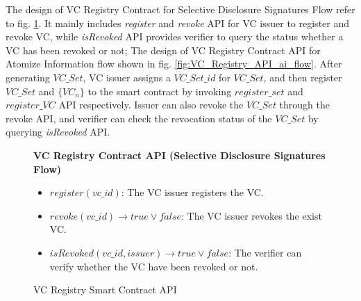 \documentclass[conference, dvipdfmx]{IEEEtran} %
\begin{document}
\begin{sloppypar}
The design of VC Registry Contract for Selective Disclosure Signatures Flow refer to fig. \ref{fig:VC_Registry_API_sd_flow}.  It mainly includes \textit{register} and \textit{revoke} API for VC issuer to register and revoke VC, while \textit{isRevoked} API provides verifier to query the status whether a VC has been revoked or not;
The design of VC Registry Contract API for Atomize Information flow shown in fig. \ref{fig:VC_Registry_API_ai_flow}. After generating $VC\_Set$, VC issuer assigns a $VC\_Set\_id$ for $VC\_Set$, and then register $VC\_Set$ and $\{VC_n\}$ to the smart contract by invoking $register\_set$ and $register\_VC$ API respectively. 
Issuer can also revoke the $VC\_Set$ through the revoke API, and verifier can check the revocation status of the $VC\_Set$ by querying \textit{isRevoked} API.

\begin{figure}[htbp]
  \centering
  \begin{varwidth}{8.5cm}
  \fbox
  {\parbox{\textwidth}
    {
      \begin{center}
        \textbf{VC Registry Contract API (Selective Disclosure Signatures Flow)}
      \end{center}
      \begin{itemize}
        \item $register(vc\_id)$: The VC issuer registers the VC.
        \item $revoke(vc\_id) 	\rightarrow true \lor false$: The VC issuer revokes the exist VC. 
        \item $isRevoked(vc\_id, issuer)  \rightarrow true \lor false$: The verifier can verify whether the VC have been revoked or not. 
      \end{itemize}
    }
  }
  \end{varwidth}
  \caption{VC Registry Smart Contract API}
  \label{fig:VC_Registry_API_sd_flow}
\end{figure}


\end{sloppypar}
\end{document}
